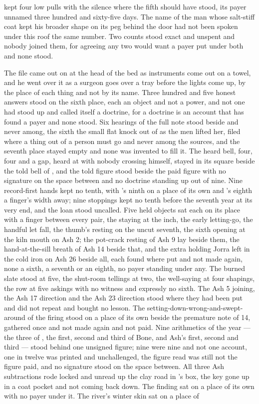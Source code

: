 kept four low pulls with the silence where the fifth should have stood, its payer unnamed three hundred and sixty-five days. The name of the man whose salt-stiff coat kept his broader shape on its peg behind the door had not been spoken under this roof the same number. Two counts stood exact and unspent and nobody joined them, for agreeing any two would want a payer put under both and none stood.

The file came out on  at the head of the bed as instruments come out on a towel, and he went over it as a surgeon goes over a tray before the lights come up, by the place of each thing and not by its name. Three hundred and five honest answers stood on the sixth place, each an object and not a power, and not one had stood up and called itself a doctrine, for a doctrine is an account that has found a payer and none stood. Six hearings of the full note stood beside and never among, the sixth the small flat knock out of  as the men lifted her, filed where a thing out of a person must go and never among the sources, and the seventh place stayed empty and none was invented to fill it. The heard bell, four, four and a gap, heard at  with nobody crossing himself, stayed in its square beside the told bell of , and the told figure stood beside the paid figure with no signature on the space between and no doctrine standing up out of nine. Nine record-first hands kept no tenth, with 's ninth on a place of its own and 's eighth a finger's width away; nine stoppings kept no tenth before the seventh year at its very end, and the loan stood uncalled. Five held objects sat each on its place with a finger between every pair, the staying at the inch, the early letting-go, the handful let fall, the thumb's resting on the uncut seventh, the sixth opening at the kiln mouth on Ash 2; the pot-crack resting of Ash 9 lay beside them, the hand-at-the-sill breath of Ash 14 beside that, and the extra holding Jorra left in the cold iron on Ash 26 beside all, each found where put and not made again, none a sixth, a seventh or an eighth, no payer standing under any. The burned slate stood at five, the shut-room tellings at two, the well-saying at four shapings, the row at five askings with no witness and expressly no sixth. The Ash 5 joining, the Ash 17 direction and the Ash 23 direction stood where they had been put and did not repeat and bought no lesson. The setting-down-wrong-and-swept-around of the firing stood on a place of its own beside the premature note of  14, gathered once and not made again and not paid. Nine arithmetics of the year --- the three of , the first, second and third of Bone, and Ash's first, second and third --- stood behind one unsigned figure; nine were nine and not one account, one in twelve was printed and unchallenged, the figure read was still not the figure paid, and no signature stood on the space between. All three Ash subtractions rode locked and unread up the clay road in 's box, the key gone up in a coat pocket and not coming back down. The finding sat on a place of its own with no payer under it. The river's winter skin sat on a place of 